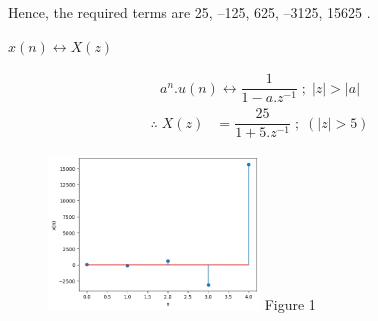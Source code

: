 \documentclass[journal,12pt,twocolumn]{IEEEtran}
\theoremstyle{remark}
\begin{document}
Hence, the required terms are 25, –125, 625, –3125, 15625 .\\

\begin{center}
 $x(n) \longleftrightarrow X(z)$
\end{center}
 \begin{align}
a^{n}.u(n)  \leftrightarrow  \dfrac{1}{1 - a.z^{-1}} \; ; \; |z| > |a| 
 \end{align}
  \begin{align}
\therefore \; X(z) &= \dfrac{25}{1 + 5.z^{-1}} \; ; \;( |z| > 5 )
 \end{align}


\begin{figure}
  \centering
  \includegraphics[width=0.5\textwidth]{figures/grasi2.png} 
 Figure 1
\end{figure}
\end{document}
